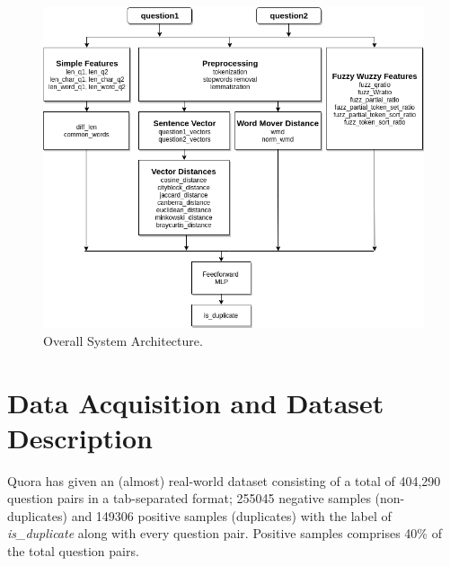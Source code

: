 \begin{figure}[H]
\begin{center}
	\includegraphics[width = 5.7in]{images/arch.png}
	\caption{Overall System Architecture.}
\end{center}
\end{figure}


\section{Data Acquisition and Dataset Description}
Quora has given an (almost) real-world dataset\cite{dataset} consisting of a total of 404,290 question pairs in a tab-separated format; 255045 negative samples (non-duplicates) and 149306 positive samples (duplicates)  with the label of \textit{is\_duplicate} along with every question pair. Positive samples comprises 40\% of the total question pairs.

